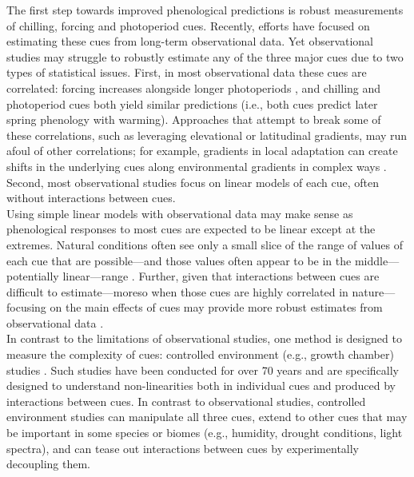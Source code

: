 \documentclass[11pt,letter]{article}
\begin{document}
The first step towards improved phenological predictions is robust measurements of chilling, forcing and photoperiod cues. Recently, efforts have focused on estimating these cues from long-term observational data. Yet observational studies may struggle to robustly estimate any of the three major cues due to two types of statistical issues. First, in most observational data these cues are correlated: forcing increases alongside longer photoperiods \citep{sarahailene2020}, and chilling and photoperiod cues both yield similar predictions (i.e., both cues predict later spring phenology with warming). Approaches that attempt to break some of these correlations, such as leveraging elevational or latitudinal gradients, may run afoul of other correlations; for example, gradients in local adaptation can create shifts in the underlying cues along environmental gradients in complex ways \citep{tansey2017}. Second, most observational studies focus on linear models of each cue, often without interactions between cues. \\

Using simple linear models with observational data may make sense as phenological responses to most cues are expected to be linear except at the extremes. Natural conditions often see only a small slice of the range of values of each cue that are possible---and those values often appear to be in the middle---potentially linear---range \citep{gauzere2017,ettinger2020}. Further, given that interactions between cues are difficult to estimate---moreso when those cues are highly correlated in nature---focusing on the main effects of cues may provide more robust estimates from observational data  \citep[main effects integrate over any interactions and require lower statistical power to robustly estimate compared to interactions,][]{gelman2006}. \\

In contrast to the limitations of observational studies, one method is designed to measure the complexity of cues: controlled environment (e.g., growth chamber) studies \citep{nagano2012,satake2013}. Such studies have been conducted for over 70 years and are specifically designed to understand non-linearities both in individual cues and produced by interactions between cues. In contrast to observational studies, controlled environment studies can manipulate all three cues, extend to other cues that may be important in some species or biomes (e.g., humidity, drought conditions, light spectra), and can tease out interactions between cues by experimentally decoupling them.\\
\end{document}
